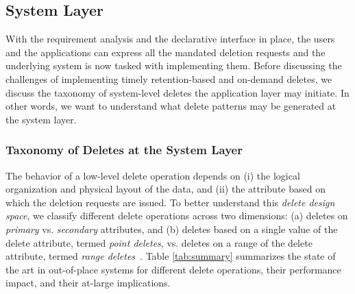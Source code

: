 \documentclass[11pt,dvipdfmx]{article}
\begin{document}
\subsection{System Layer}
\label{subsec:system-level}

With the requirement analysis and the declarative interface in place, the users
and the applications can express all the mandated deletion requests and the
underlying system is now tasked with implementing them. Before discussing the 
challenges of implementing timely retention-based and on-demand deletes, we discuss
the taxonomy of system-level deletes the application layer may initiate. In other
words, we want to understand what delete patterns may be generated at the system
layer. 

\subsubsection{Taxonomy of Deletes at the System Layer}
The behavior of a low-level delete operation depends on (i) the logical organization 
and physical layout of the data, and (ii) the attribute based on which the deletion
requests are issued. To better understand this \emph{delete design space}, we
classify different delete operations across two dimensions: (a) deletes on 
\emph{primary} vs. \emph{secondary} attributes, and (b) deletes based
on a single value of the delete attribute, termed \emph{point deletes}, vs. 
deletes on a range of the delete attribute, termed \emph{range 
deletes}~\cite{Sarkar2020}.
Table \ref{tab:summary} summarizes the state of the art in out-of-place
systems for different delete operations, their performance impact, and their 
at-large implications.
\end{document}
